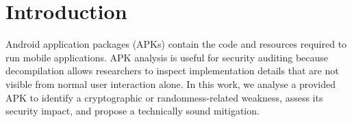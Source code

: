 \section{Introduction}

Android application packages (APKs) contain the code and resources required to
run mobile applications. APK analysis is useful for security auditing because
decompilation allows researchers to inspect implementation details that are not
visible from normal user interaction alone. In this work, we analyse a provided
APK to identify a cryptographic or randomness-related weakness, assess its
security impact, and propose a technically sound mitigation.
